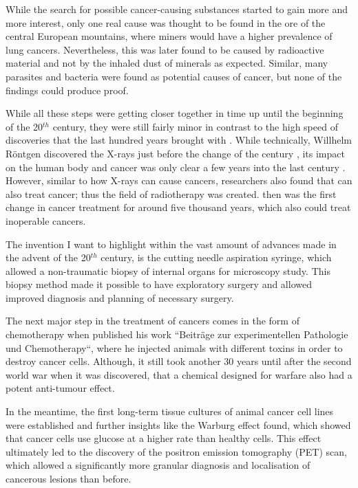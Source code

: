 While the search for possible cancer-causing substances started to gain more and more interest, only one real cause was thought to be found in the ore of the central European mountains, where miners would have a higher prevalence of lung cancers. Nevertheless, this was later found to be caused by radioactive material and not by the inhaled dust of minerals as expected. Similar, many parasites and bacteria were found as potential causes of cancer, but none of the findings could produce proof.

While all these steps were getting closer together in time up until the beginning of the 20$^{th}$ century, they were still fairly minor in contrast to the high speed of discoveries that the last hundred years brought with . While technically, Willhelm R\"ontgen discovered the X-rays just before the change of the century \cite{Roentgen1898}, its impact on the human body and cancer was only clear a few years into the last century \cite{Frieben1902,Scholtz1902}. However, similar to how X-rays can cause cancers, researchers also  found  that  can also treat cancer; thus the field of radiotherapy was created.  then was the first  change in cancer treatment for around five thousand years, which also could treat inoperable cancers.

The  invention  I want to highlight within the vast amount of advances made in the advent of the 20$^{th}$ century, is the cutting needle aspiration syringe, which allowed a non-traumatic biopsy of internal organs for microscopy study. This biopsy method made it possible  to  have exploratory surgery and  allowed improved diagnosis and planning of necessary surgery.

The next major step in the treatment of cancers comes in the form of chemotherapy when \textcite{Ehrlich1909} published his work ``Beitr\"age zur experimentellen Pathologie und Chemotherapy``, where he injected animals with different toxins in order to destroy cancer cells. Although, it still took another 30 years until after the second world war when it was discovered, that a chemical designed for warfare also had a potent anti-tumour effect.

In the meantime, the first long-term tissue cultures of animal cancer cell lines were established and further insights like the Warburg effect \cite{Warburg1928}  found, which showed that cancer cells use glucose at a higher rate than healthy cells. This effect ultimately led to the discovery of the positron emission tomography (PET) scan, which allowed a significantly more granular diagnosis and localisation of cancerous lesions than before.

